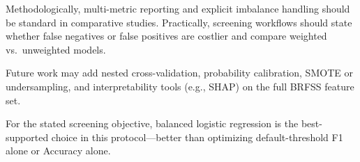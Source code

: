 \documentclass[11pt,a4paper]{article}
\begin{document}
Methodologically, multi-metric reporting and explicit imbalance handling should be standard in comparative studies. Practically, screening workflows should state whether false negatives or false positives are costlier and compare weighted vs.\ unweighted models.

Future work may add nested cross-validation, probability calibration, SMOTE or undersampling, and interpretability tools (e.g., SHAP) on the full BRFSS feature set.

For the stated screening objective, balanced logistic regression is the best-supported choice in this protocol---better than optimizing default-threshold F1 alone or Accuracy alone.

\clearpage
\renewcommand{\refname}{References}
\end{document}
